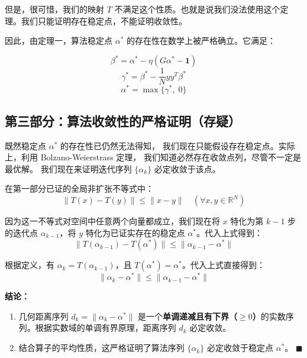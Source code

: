 但是，很可惜，我们的映射 $T$ 不满足这个性质。也就是说我们没法使用这个定理。我们只能证明存在稳定点，不能证明收敛性。

因此，由定理一，算法稳定点 $\alpha^*$ 的存在性在数学上被严格确立。它满足：

\begin{equation}
\beta^* = \alpha^* - \eta (G \alpha^* - \mathbf{1})
\end{equation}
\begin{equation}
\gamma^* = \beta^* - \frac{1}{N} y y^T \beta^*
\end{equation}
\begin{equation}
\alpha^* = \max\{\gamma^*, \; 0\}
\end{equation}

\subsection{第三部分：算法收敛性的严格证明（存疑）}

既然稳定点 $\alpha^*$ 的存在性已仍然无法得知，
我们现在只能假设存在稳定点。实际上，利用 Bolzano-Weierstrass 定理，
我们知道必然存在收敛点列，尽管不一定是最优解。
我们现在来证明迭代序列 $\{\alpha_k\}$ 必定收敛于该点。

在第一部分已证的全局非扩张不等式中：
\begin{equation}
\|T(x) - T(y)\| \leqslant \|x - y\| \quad (\forall x, y \in \mathbb{R}^N)
\end{equation}

因为这一不等式对空间中任意两个向量都成立，我们现在将 $x$ 特化为第 $k-1$ 步的迭代点 $\alpha_{k-1}$，将 $y$ 特化为已证实存在的稳定点 $\alpha^*$。代入上式得到：
\begin{equation}
\|T(\alpha_{k-1}) - T(\alpha^*)\| \leqslant \|\alpha_{k-1} - \alpha^*\|
\end{equation}

根据定义，有 $\alpha_k = T(\alpha_{k-1})$，且 $T(\alpha^*) = \alpha^*$。代入上式直接得到：
\begin{equation}
\boxed{ \|\alpha_k - \alpha^*\| \leqslant \|\alpha_{k-1} - \alpha^*\| }
\end{equation}

\textbf{结论：}

\begin{enumerate}
\item 几何距离序列 $d_k = \|\alpha_k - \alpha^*\|$ 是一个\textbf{单调递减且有下界（$\geqslant 0$）}的实数序列。根据实数域的单调有界原理，距离序列 $d_k$ 必定收敛。
\item 结合算子的平均性质，这严格证明了算法序列 $\{\alpha_k\}$ 必定收敛于稳定点 $\alpha^*$。 $\blacksquare$
\end{enumerate}